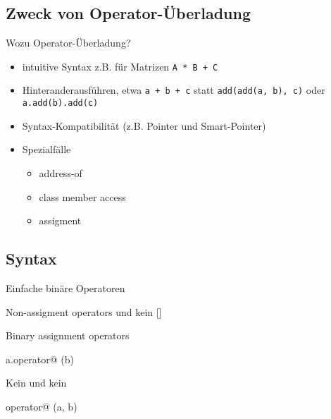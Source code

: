 \subsection{Zweck von Operator-Überladung}

\begin{frame}[fragile]{Wozu Operator-Überladung?}
	\begin{itemize}
		\item intuitive Syntax z.B. für Matrizen \verb|A * B + C|
		\pause
		\item Hinteranderausführen, etwa \verb|a + b + c| statt \verb|add(add(a, b), c)| oder \verb|a.add(b).add(c)|
		\pause
		\item Syntax-Kompatibilität (z.B. Pointer und Smart-Pointer)
		\pause
		\item Spezialfälle
		\begin{itemize}
			\item address-of \cppop{\&}
			\item class member access \cppop{-\textgreater} 
			\item assigment \cppop{=}
		\end{itemize}
	\end{itemize}
\end{frame}




\subsection{Syntax}

\begin{frame}[fragile, b]{Einfache binäre Operatoren}
	\onslide*<+>
	{
		\begin{block}{}
			
		\end{block}
	}
	
	\onslide*<+>
	{
		Non-assigment operators und kein []
		
		\begin{block}{}
			
		\end{block}
	}
	
	\vspace{3em}
\end{frame}


\begin{frame}[fragile, b]{Binary assignment operators}
	\onslide*<+>
	{
		\begin{block}{a.operator@ (b)}
			
		\end{block}
	}
	
	\onslide*<+>
	{
		Kein \cppop{[]} und kein \cppop{()}
		
		\begin{block}{operator@ (a, b)}
			
		\end{block}
	}
	
	\vspace{1em}
\end{frame}


